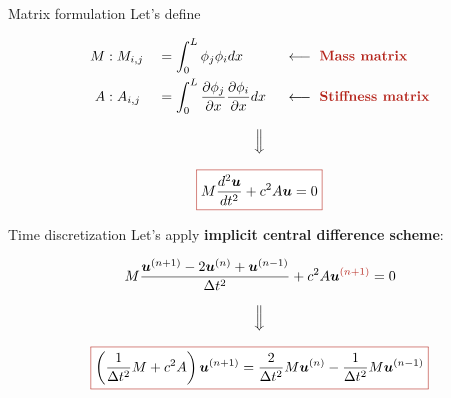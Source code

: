 \begin{frame}{Matrix formulation}
    Let's define

    \begin{alignat*}{3}
        M&:M_{i,j}&&=\int_0^L\phi_j\phi_idx \ &&\longleftarrow \ \text{\textbf{\textcolor{BrickRed}{Mass matrix}}}\\
        A&:A_{i,j}&&=\int_0^L\frac{\partial\phi_j}{\partial x}\frac{\partial\phi_i}{\partial x}dx \ &&\longleftarrow \ \text{\textbf{\textcolor{BrickRed}{Stiffness matrix}}}
    \end{alignat*}

    \pause

    \begin{equation*}
        \Big\Downarrow
    \end{equation*}

    \begin{equation*}
        \fcolorbox{BrickRed}{white}{\text{$\displaystyle M\frac{d^2\boldsymbol{u}}{dt^2}+c^2A\boldsymbol{u}=0$}}
    \end{equation*}
\end{frame}

\begin{frame}{Time discretization}
    Let's apply \textbf{\textcolor{BrickRed}{implicit} central difference scheme}:

    \begin{equation*}
        M\frac{\boldsymbol{u}^{(n+1)}-2\boldsymbol{u}^{(n)}+\boldsymbol{u}^{(n-1)}}{\Delta t^2}+c^2A\boldsymbol{u}^{\textcolor{BrickRed}{(n+1)}}=0
    \end{equation*}

    \pause

    \begin{equation*}
        \Big\Downarrow
    \end{equation*}

    \begin{equation*}
        \fcolorbox{BrickRed}{white}{\text{$\displaystyle\left(\frac{1}{\Delta t^2}M+c^2A\right)\boldsymbol{u}^{(n+1)}=\frac{2}{\Delta t^2}M\boldsymbol{u}^{(n)}-\frac{1}{\Delta t^2}M\boldsymbol{u}^{(n-1)}$}}
    \end{equation*}
\end{frame}

